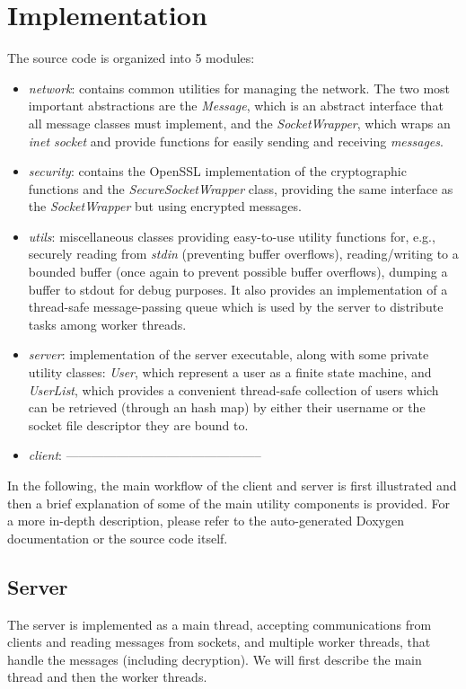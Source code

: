 \section{Implementation}
\label{ref:modules}
The source code is organized into 5 modules:
\begin{itemize}
    \item \emph{network}: contains common utilities for managing the network. 
        The two most important abstractions are the \emph{Message}, which 
        is an abstract interface that all message classes must implement, and 
        the \emph{SocketWrapper}, which wraps an \emph{inet socket} and 
        provide functions for easily sending and receiving \emph{messages}.
    \item \emph{security}: contains the OpenSSL implementation of the 
        cryptographic functions and the \emph{SecureSocketWrapper} class,
        providing the same interface as the \emph{SocketWrapper} but using 
        encrypted messages.
    \item \emph{utils}: miscellaneous classes providing easy-to-use utility 
        functions for, e.g., securely reading from \emph{stdin} (preventing 
        buffer overflows), reading/writing to a bounded buffer (once again 
        to prevent possible buffer overflows), dumping a buffer to stdout 
        for debug purposes. It also provides an implementation of a thread-safe
        message-passing queue which is used by the server to distribute tasks
        among worker threads.
    \item \emph{server}: implementation of the server executable, along with
        some private utility classes: \emph{User}, which represent a user as 
        a finite state machine, and \emph{UserList}, which provides a convenient
        thread-safe collection of users which can be retrieved (through an
        hash map) by either their username or the socket file descriptor they 
        are bound to.
    \item \emph{client}: -----------------------------------------------
\end{itemize}

In the following, the main workflow of the client and server is first
illustrated and then a brief explanation of some of the main utility components 
is provided. For a more in-depth description, please refer to the auto-generated 
Doxygen documentation or the source code itself.

\subsection{Server}
The server is implemented as a main thread, accepting communications from 
clients and reading messages from sockets, and multiple worker threads, that 
handle the messages (including decryption). We will first describe the main 
thread and then the worker threads.

